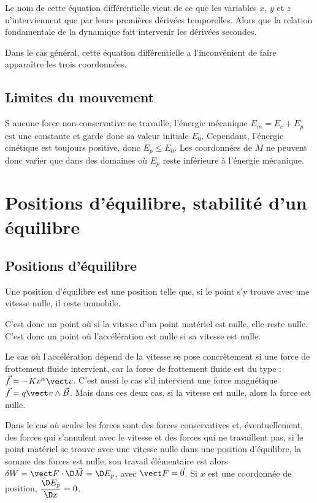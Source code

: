 Le nom de cette équation différentielle vient de ce que les variables $x$, $y$ et $z$ n'interviennent que par leurs premières dérivées temporelles. Alors que la relation fondamentale de la dynamique fait intervenir les dérivées secondes.

Dans le cas général, cette équation différentielle a l'inconvénient de faire apparaître les trois coordonnées.

\subsection{Limites du mouvement}
\label{chap4-subsec:limitesdumvt}

S aucune force non-conservative ne travaille, l'énergie mécanique $E_m=E_c+E_p$ est une constante et garde donc sa valeur initiale $E_0$. Cependant, l'énergie cinétique est toujours positive, donc $E_p \leq E_0$. Les coordonnées de $M$ ne peuvent donc varier que dans des domaines où $E_p$ reste inférieure à l'énergie mécanique.

\section{Positions d'équilibre, stabilité d'un équilibre}
\label{chap4-sec:positiondequilibre}

\subsection{Positions d'équilibre}
\label{chap4-subsec:positionsdequilibre}

\begin{defdef}
  Une position d'équilibre est une position telle que, si le point s'y trouve avec une vitesse nulle, il reste immobile.
\end{defdef}

C'est donc un point où si la vitesse d'un point matériel est nulle, elle reste nulle. C'est donc un point où l'accélération est nulle si sa vitesse est nulle.

Le cas où l'accélération dépend de la vitesse se pose concrètement si une force de frottement fluide intervient, car la force de frottement fluide est du type : $\vec{f}=-Kv^{\alpha}\vv$. C'est aussi le cas s'il intervient une force magnétique $\vec{f} = q\vv \wedge \vec{B}$. Mais dans ces deux cas, si la vitesse est nulle, alors la force est nulle.

Dans le cas où seules les forces sont des forces conservatives et, éventuellement, des forces qui s'annulent avec le vitesse et des forces qui ne travaillent pas, si le point matériel se trouve avec une vitesse nulle dans une position d'équilibre, la somme des forces est nulle, son travail élémentaire est alors $\delta W=\vF \cdot \D\vec{M}=\D E_p$, avec $\vF=\vec{0}$. Si $x$ est une coordonnée de position, $\derived{E_p}{x}=0$.

